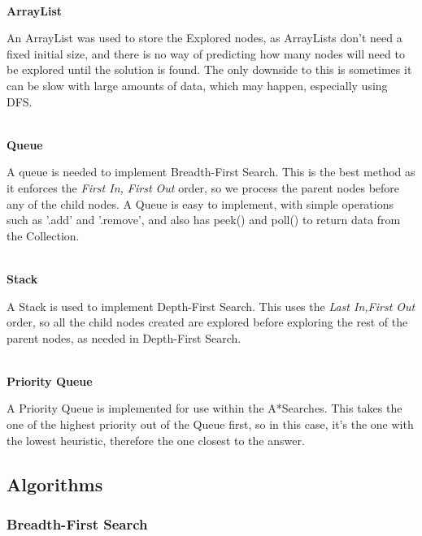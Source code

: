 \documentclass[11pt]{article} %
\begin{document}
				\hspace{0pt} \\
				\textbf{ArrayList}

				An ArrayList was used to store the Explored nodes, as ArrayLists don't need a fixed initial size, and there is no way of predicting how many nodes will need to be explored until the solution is found. The only downside to this is sometimes it can be slow with large amounts of data, which may happen, especially using DFS.

				\hspace{0pt} \\
				\textbf{Queue}

				A queue is needed to implement Breadth-First Search. This is the best method as it enforces the \textit{First In, First Out} order, so we process the parent nodes before any of the child nodes. A Queue is easy to implement, with simple operations such as '.add' and '.remove', and also has peek() and poll() to return data from the Collection.

				\hspace{0pt} \\
				\textbf{Stack}

				A Stack is used to implement Depth-First Search. This uses the \textit{Last In,First Out} order, so all the child nodes created are explored before exploring the rest of the parent nodes, as needed in Depth-First Search.

				\hspace{0pt} \\
				\textbf{Priority Queue}

				A Priority Queue is implemented for use within the A*Searches. This takes the one of the highest priority out of the Queue first, so in this case, it's the one with the lowest heuristic, therefore the one closest to the answer.
	
	\newpage
		\subsection{Algorithms}
	
			\subsubsection{Breadth-First Search}
\end{document}
